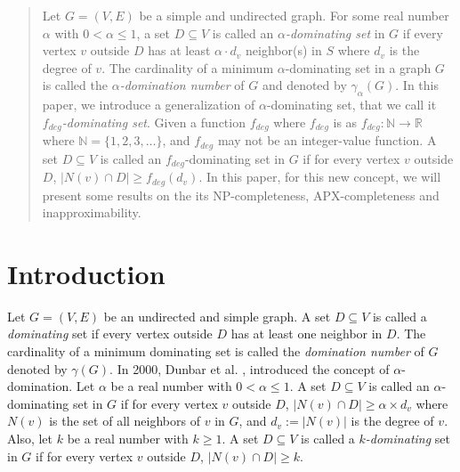 \documentclass[a0,portrait]{a0poster}
\theoremstyle{definition}
\theoremstyle{plain}
\theoremstyle{definition}
\newcommand{\keywords}[1]{}
\newcommand{\subject}[1]{}
\begin{document}
\begin{multicols}{2} %

%
\begin{abstract}\normalsize
Let $G=(V, E)$ be a simple and undirected  graph. For some real number $\alpha$ with $0<\alpha\leq1$, a set $D\subseteq V$ is called {an} {\it $\alpha$-dominating set} in  $G$ if every vertex $v$ outside $D$ has at least $\alpha\cdot d_v$ neighbor(s) in $S$ where $d_v$ is the degree of $v$. {The cardinality of a minimum $\alpha$-dominating set in a graph $G$ is called the} {\it $\alpha$-domination number} of $G$ and denoted by $\gamma_{\alpha}(G)$. In this paper, we introduce a generalization of $\alpha$-dominating set, that we call it {\it {\it $f_{deg}$-dominating} set}. Given a function $f_{deg}$ where $f_{deg}$ {is   as $f_{deg}:\mathbb{N}\rightarrow \mathbb{R}$} where $\mathbb{N}=\{1, 2, 3, \ldots\}$, and $f_{deg}$ may not be {an} integer-value function.  A set $D\subseteq V$ is called an  {$f_{deg}$-dominating} set in $G$ if for every vertex $v$ outside $D$, $|N(v)\cap D|\geq f_{deg}(d_v)$. In this paper, for this new concept, we will present some results on the its NP-completeness,  APX-completeness and  inapproximability. 
\end{abstract}
\keywords{Domination,  $\alpha$-Domination, $k$-Domination, APX-Complete, NP-Complete}
\subject{05C69, 11Y16}

\section{Introduction}
Let $G=(V, E)$ be an undirected and simple graph. A set $D\subseteq V$ is called {a} {\it dominating} set if every vertex  outside $D$ has at least one neighbor in $D$. {The} {cardinality} of a minimum dominating set is called {the} {\it domination number} of $G$ denoted by $\gamma(G)$.   In 2000,  Dunbar  et al.  \cite{dunbar2000alpha},  introduced the concept  of $\alpha$-domination. Let $\alpha$ be a real number with $0<\alpha\leq1$. A set $D\subseteq V$ is called an $\alpha$-dominating set in $G$ if for every vertex $v$ outside $D$, $|N(v)\cap D|\geq \alpha\times d_v$ where $N(v)$ is the set of all neighbors of $v$ in  $G$, and $d_v:=|N(v)|$ is the degree of $v$. Also, let $k$ be a real number with $k\geq 1$. A set $D\subseteq V$ is called a  {\it $k$-dominating} set in $G$ if for every vertex $v$ outside $D$, $|N(v)\cap D|\geq k$.


\end{multicols}
\end{document}
